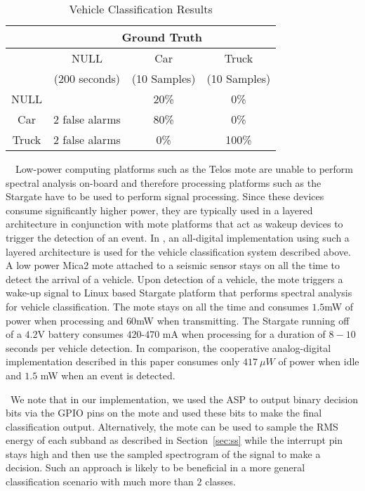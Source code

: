 \begin{table}[!t]
  \renewcommand{\arraystretch}{1.3}
  \caption{Vehicle Classification Results}
  \label{tab:classResults}
  \centering
  \begin{tabular}{|c|c|c|c|}
    \hline
    & \multicolumn{3}{|c|}{Ground Truth} \\ \hline
    & NULL & Car & Truck \\ 
    & (200 seconds) & (10 Samples) & (10 Samples) \\ \hline
    NULL &  & 20\% & 0\% \\ \hline
    Car & 2 false alarms & 80\% & 0\% \\ \hline
    Truck & 2 false alarms & 0\% & 100\% \\ \hline
  \end{tabular}
\end{table}

~~Low-power computing platforms such as the Telos mote are unable to perform spectral analysis on-board and therefore processing platforms such as the Stargate have to be used to perform signal processing. Since these devices consume significantly higher power, they are typically used in  a layered architecture in conjunction with mote platforms that act as wakeup devices to trigger the detection of an event. In \cite{lanl}, an all-digital implementation using such a layered architecture is used for the vehicle classification system described above. A low power Mica2 mote attached to a seismic sensor stays on all the time to detect the arrival of a vehicle. Upon detection of a vehicle, the mote triggers a wake-up signal to Linux based Stargate platform that performs spectral analysis for vehicle classification. The mote stays on all the time and consumes $1.5$mW of power when processing and $60$mW when transmitting. The Stargate running off of a $4.2$V battery consumes $420$-$470$ mA when processing for a duration of $8-10$ seconds per vehicle detection. In comparison, the cooperative analog-digital implementation described in this paper consumes only $417~\mu W$ of power when idle and $1.5$ mW when an event is detected. 

~We note that in our implementation, we used the ASP to output binary decision bits via the GPIO pins on the mote and used these bits to make the final classification output. Alternatively, the mote can be used to sample the RMS energy of each subband as described in Section~\ref{sec:ss} while the interrupt pin stays high and then use the sampled spectrogram of the signal to make a decision. Such an approach is likely to be beneficial in a more general classification scenario with much more than $2$ classes. 

